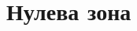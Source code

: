 \chapter*{Нулева зона}
% 
% 
%     
%     
%     
%     
%     
%     
%     
%     
%     
%     
%     
%     
%     
%     
%     
%     
%     
